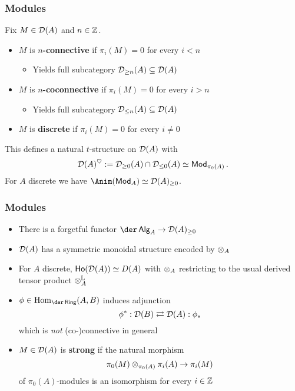 \documentclass[11pt]{beamer}
\begin{document}
\begin{frame}
\frametitle{Modules}
\pause Fix $M\in\mathcal{D}(A)$ and $n\in\mathbb{Z}$.
\begin{itemize}
\pause\item $M$ is \textbf{$n$-connective} if $\pi_i(M)=0$ for every $i<n$
\begin{itemize}
	\pause\item Yields full subcategory $\mathcal{D}_{\geq n}(A)\subseteq\mathcal{D}(A)$
\end{itemize}

\pause\item $M$ is \textbf{$n$-coconnective} if $\pi_i(M)=0$ for every $i>n$
\begin{itemize}
	\pause\item Yields full subcategory $\mathcal{D}_{\leq n}(A)\subseteq\mathcal{D}(A)$
\end{itemize}

\pause\item $M$ is \textbf{discrete} if $\pi_i(M)=0$ for every $i\neq0$
\end{itemize}
\pause This defines a natural $t$-structure on $\mathcal{D}(A)$ with 
$$\mathcal{D}(A)^{\heartsuit}:=\mathcal{D}_{\geq0}(A)\cap\mathcal{D}_{\leq0}(A)\simeq\operatorname{\mathsf{Mod}}_{\pi_0(A)}.$$
\pause For $A$ discrete we have $\Anim(\Mod_A)\simeq\D(A)_{\geq0}$.
\end{frame}

\begin{frame}
\frametitle{Modules}
\begin{itemize}
\pause\item There is a forgetful functor $\der\Alg_A\to\D(A)_{\geq0}$
\pause\item $\mathcal{D}(A)$ has a symmetric monoidal structure encoded by $\otimes_A$
\pause\item For $A$ discrete, $\operatorname{\mathsf{Ho}}(\mathcal{D}(A))\simeq D(A)$ with $\otimes_A$ restricting to the usual derived tensor product $\otimes^{\mathbb{L}}_A$
\pause\item $\phi\in\Hom_{\der\Ring}(A,B)$ induces adjunction 
$$\phi^*: \mathcal{D}(B)\rightleftarrows\mathcal{D}(A): \phi_*$$ 
which is \emph{not} (co-)connective in general
\pause\item $M\in\mathcal{D}(A)$ is \textbf{strong} if the natural morphism 
$$\pi_0(M)\otimes_{\pi_0(A)}\pi_i(A)\to\pi_i(M)$$ 
of $\pi_0(A)$-modules is an isomorphism for every $i\in\mathbb{Z}$
\end{itemize}
\end{frame}
\end{document}
